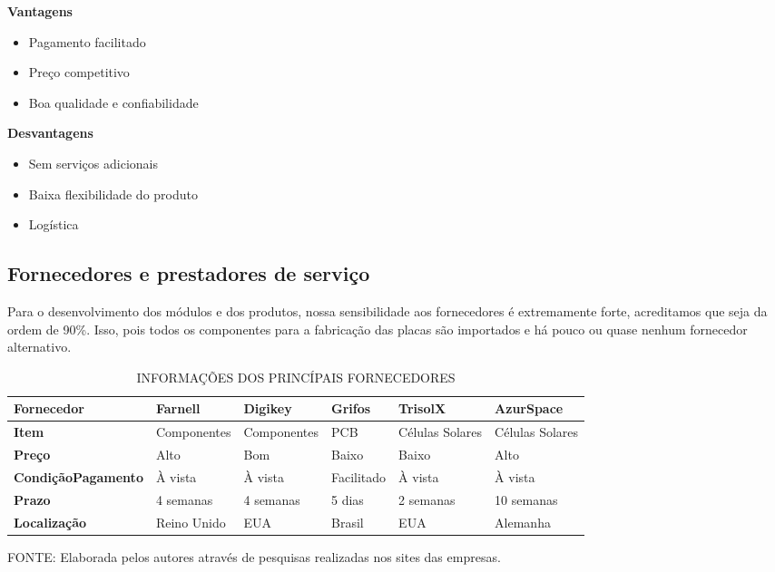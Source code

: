 \documentclass[
	12pt,				%
	openright,			%
	oneside,			%
	a4paper,			%
	english,			%
	french,				%
	spanish,			%
	brazil				%
	]{abntex2}
\begin{document}
	\begin{minipage}{7cm}
	\begin{center}
	\textbf{Vantagens}
	\end{center}
	
	\begin{itemize}
	\item Pagamento facilitado
	\item Preço competitivo
	\item Boa qualidade e confiabilidade
	\end{itemize}
	\end{minipage}
	\begin{minipage}{7cm}
	\begin{center}
	\textbf{Desvantagens}
	\end{center}
	
	\begin{itemize}
	\item Sem serviços adicionais
	\item Baixa flexibilidade do produto
	\item Logística
	\end{itemize}		
	\end{minipage}
	
\subsection[Fornecedores e prestadores de serviço]{Fornecedores e prestadores de serviço}

	Para o desenvolvimento dos módulos e dos produtos, nossa sensibilidade aos fornecedores é extremamente forte, acreditamos que seja da ordem de 90\%. Isso, pois todos os componentes para a fabricação das placas são importados e há pouco ou quase nenhum fornecedor alternativo.
	
	\begin{table} [th]
	\caption{INFORMAÇÕES DOS PRINCÍPAIS FORNECEDORES}
	\centering
	\begin{tabular}{|p{2.3cm}|p{2.5cm}|p{2.5cm}|p{1.6cm}|p{1.4cm}|p{1.7cm}|}
	\hline
	\textbf{Fornecedor} & Farnell & Digikey & Grifos & TrisolX & AzurSpace \\
	\hline
	\textbf{Item} & Componentes & Componentes & PCB & Células Solares & Células Solares\\
	\hline
	\textbf{Preço} & Alto & Bom & Baixo & Baixo & Alto\\
	\hline
	\textbf{Condição\linebreak Pagamento} & À vista & À vista & Facilitado & À vista & À vista \\
	\hline
	\textbf{Prazo} & 4 semanas & 4 semanas & 5 dias & 2 semanas & 10 semanas\\
	\hline
	\textbf{Localização} & Reino Unido & EUA & Brasil & EUA & Alemanha \\
	\hline
	
	\end{tabular}
	
	\begin{small}
		FONTE: Elaborada pelos autores através de pesquisas realizadas nos sites das empresas.
	\end{small}
	\end{table}
	
\end{document}
